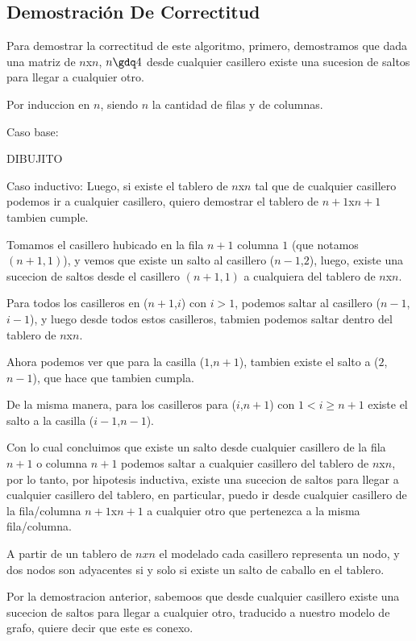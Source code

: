 \newpage
\subsection{Demostraci\'on De Correctitud}

Para demostrar la correctitud de este algoritmo, primero, demostramos que dada una matriz de $n$x$n$, $n\gdq 4$ desde cualquier casillero existe una sucesion de saltos para llegar a cualquier otro. 

Por induccion en $n$, siendo $n$ la cantidad de filas y de columnas.

Caso base:



DIBUJITO



Caso inductivo:
Luego, si existe el tablero de $n$x$n$ tal que de cualquier casillero podemos ir a cualquier casillero, quiero demostrar el tablero de $n+1$x$n+1$ tambien cumple.

Tomamos el casillero hubicado en la fila $n+1$ columna $1$ (que notamos $(n+1,1)$), y vemos que existe un salto al casillero ($n-1$,$2$), luego, existe una sucecion de saltos desde el casillero $(n+1,1)$ a cualquiera del tablero de $n$x$n$.

Para todos los casilleros en ($n+1$,$i$) con $i>1$, podemos saltar al casillero ($n-1$,$i-1$), y luego desde todos estos casilleros, tabmien podemos saltar dentro del tablero de $n$x$n$.

Ahora podemos ver que para la casilla ($1$,$n+1$), tambien existe el salto a ($2$,$n-1$), que hace que tambien cumpla.

De la misma manera, para los casilleros para ($i$,$n+1$) con $1< i \geq n+1$ existe el salto a la casilla ($i-1$,$n-1$).

Con lo cual concluimos que existe un salto desde cualquier casillero de la fila $n+1$ o columna $n+1$ podemos saltar a cualquier casillero del tablero de $n$x$n$, por lo tanto, por hipotesis inductiva, existe una sucecion de saltos para llegar a cualquier casillero del tablero, en particular, puedo ir desde cualquier casillero de la fila/columna $n+1$x$n+1$ a cualquier otro que pertenezca a la misma fila/columna.

A partir de un tablero de $nxn$ el modelado cada casillero representa un nodo, y dos nodos son adyacentes si y solo si existe un salto de caballo en el tablero.

Por la demostracion anterior, sabemoos que desde cualquier casillero existe una sucecion de saltos para llegar a cualquier otro, traducido a nuestro modelo de grafo, quiere decir que este es conexo.

